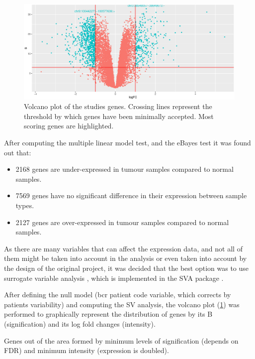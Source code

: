\documentclass[9pt,twocolumn,twoside]{gsajnl}
\begin{document}
\begin{figure}[!h]
\centering
\includegraphics[width=\linewidth]{Volcano.eps}
\caption{Volcano plot of the studies genes. Crossing lines represent the threshold by which genes have been minimally accepted. Most scoring genes are highlighted.
}
\label{fig:volcano}
\end{figure}

After computing the multiple linear model test, and the eBayes test \cite{limma} 	it was found out that:

\begin{itemize}
\item 2168 genes are under-expressed in tumour samples compared to normal samples.
\item 7569 genes have no significant difference in their expression between sample types.
\item 2127 genes are over-expressed in tumour samples compared to normal samples.
\end{itemize}

As there are many variables that can affect the expression data, and not all of them might be taken into account in the analysis or even taken into account by the design of the original project, it was decided that the best option was to use surrogate variable analysis \cite{leek2007capturing}, which is implemented in the SVA package \cite{SVA}.


After defining the null model (bcr patient code variable, which corrects by patients variability) and computing the SV analysis, the volcano plot (\ref{fig:volcano}) was performed to graphically represent the distribution of genes by its B (signification) and its log fold changes (intensity).

Genes out of the area formed by minimum levels of signification (depends on FDR) and minimum intensity (expression is doubled).
\end{document}
